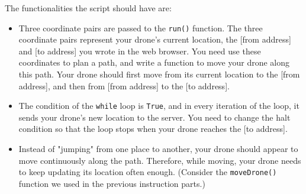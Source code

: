 \documentclass{article}
\begin{document}
The functionalities the script should have are:
\begin{itemize}
    \item Three coordinate pairs are passed to the \texttt{run()} function. The three coordinate pairs represent your drone's current location, the [from address] and [to address] you wrote in the web browser. You need use these coordinates to plan a path, and write a function to move your drone along this path. Your drone should first move from its current location to the [from address], and then from [from address] to the [to address].
    \item The condition of the \verb!while! loop is \verb!True!, and in every iteration of the loop, it sends your drone's new location to the server. You need to change the halt condition so that the loop stops when your drone reaches the [to address].
    \item Instead of "jumping" from one place to another, your drone should appear to move continuously along the path. Therefore, while moving, your drone needs to keep updating its location often enough. (Consider the \verb!moveDrone()! function we used in the previous instruction parts.)
\end{itemize}

\end{document}
